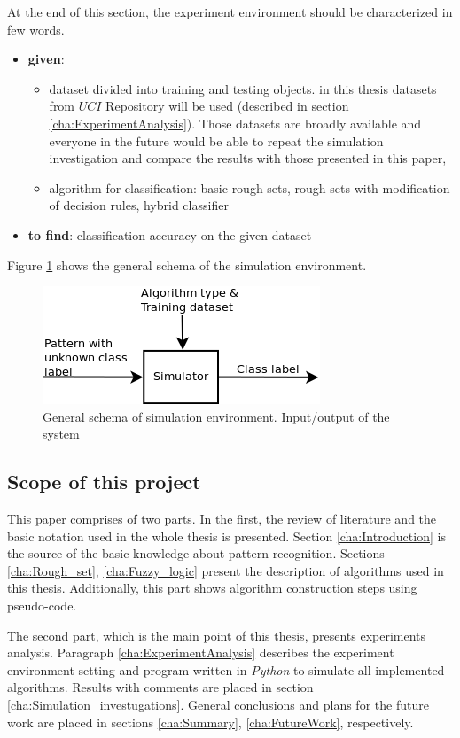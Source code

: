 At the end of this section, the experiment environment should be characterized in
few words. 
\begin{itemize}
    \item \textbf{given}:
        \begin{itemize}
            \item dataset divided into training and testing objects. in
                this thesis datasets from $UCI$ Repository will be used (described in section
                \ref{cha:ExperimentAnalysis}). Those datasets are broadly available and everyone in the
                future would be able to repeat the simulation investigation and compare the
                results with those presented in this paper,
            \item algorithm for classification: basic rough sets, rough sets
                with modification of decision rules, hybrid classifier
        \end{itemize}
    \item \textbf{to find}: classification accuracy on the given dataset
\end{itemize}
Figure \ref{fig:input_output} shows the general schema of the simulation environment.
\begin{figure}[H]
    \begin{center}
        \includegraphics{fig/schema.png}
    \end{center}
    \caption{General schema of simulation environment. Input/output of the
    system}
    \label{fig:input_output}
\end{figure}

\subsection{Scope of this project} 
This paper comprises of two parts. In the first, the review of
literature and the basic notation used in the whole thesis is presented. Section
\ref{cha:Introduction} is the source of the basic
knowledge about pattern recognition. Sections \ref{cha:Rough_set}, \ref{cha:Fuzzy_logic}
present the description of algorithms used in this thesis. Additionally, this
part shows algorithm construction steps using pseudo-code.

The second part, which is the main point of this thesis, presents experiments analysis.
Paragraph \ref{cha:ExperimentAnalysis} describes the experiment environment
setting and program written in \textit{Python} to simulate all implemented
algorithms.  Results with comments are placed in
section \ref{cha:Simulation_investugations}. General
conclusions and plans for the future work are placed in sections
\ref{cha:Summary}, \ref{cha:FutureWork}, respectively. 

